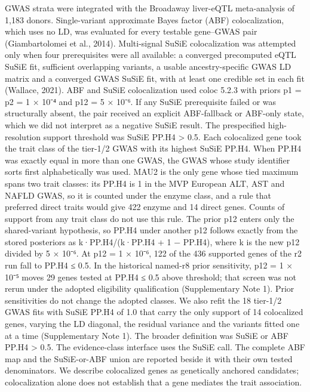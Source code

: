 GWAS strata were integrated with the Broadaway liver-eQTL meta-analysis of 1,183 donors. Single-variant approximate Bayes factor (ABF) colocalization, which uses no LD, was evaluated for every testable gene--GWAS pair (Giambartolomei et al., 2014). Multi-signal SuSiE colocalization was attempted only when four prerequisites were all available: a converged precomputed eQTL SuSiE fit, sufficient overlapping variants, a usable ancestry-specific GWAS LD matrix and a converged GWAS SuSiE fit, with at least one credible set in each fit (Wallace, 2021). ABF and SuSiE colocalization used coloc 5.2.3 with priors p1 = p2 = 1 × 10⁻⁴ and p12 = 5 × 10⁻⁶. If any SuSiE prerequisite failed or was structurally absent, the pair received an explicit ABF-fallback or ABF-only state, which we did not interpret as a negative SuSiE result. The prespecified high-resolution support threshold was SuSiE PP.H4 \textgreater{} 0.5. Each colocalized gene took the trait class of the tier-1/2 GWAS with its highest SuSiE PP.H4. When PP.H4 was exactly equal in more than one GWAS, the GWAS whose study identifier sorts first alphabetically was used. MAU2 is the only gene whose tied maximum spans two trait classes: its PP.H4 is 1 in the MVP European ALT, AST and NAFLD GWAS, so it is counted under the enzyme class, and a rule that preferred direct traits would give 422 enzyme and 14 direct genes. Counts of support from any trait class do not use this rule. The prior p12 enters only the shared-variant hypothesis, so PP.H4 under another p12 follows exactly from the stored posteriors as k·PP.H4/(k·PP.H4 + 1 − PP.H4), where k is the new p12 divided by 5 × 10⁻⁶. At p12 = 1 × 10⁻⁶, 122 of the 436 supported genes of the r2 run fall to PP.H4 ≤ 0.5. In the historical named-r8 prior sensitivity, p12 = 1 × 10⁻⁵ moves 29 genes tested at PP.H4 ≤ 0.5 above threshold; that screen was not rerun under the adopted eligibility qualification (Supplementary Note 1). Prior sensitivities do not change the adopted classes. We also refit the 18 tier-1/2 GWAS fits with SuSiE PP.H4 of 1.0 that carry the only support of 14 colocalized genes, varying the LD diagonal, the residual variance and the variants fitted one at a time (Supplementary Note 1). The broader definition was SuSiE or ABF PP.H4 \textgreater{} 0.5. The evidence-class interface uses the SuSiE call. The complete ABF map and the SuSiE-or-ABF union are reported beside it with their own tested denominators. We describe colocalized genes as genetically anchored candidates; colocalization alone does not establish that a gene mediates the trait association.

